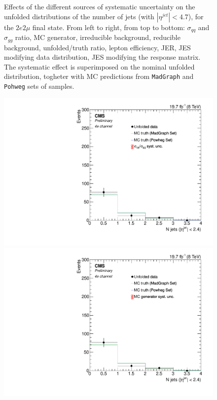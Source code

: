 \begin{figure}[hbtp]
\begin{center}
    \caption{Effects of the different sources of systematic uncertainty on the unfolded distributions of the number of jets (with $|\eta^{jet}|<4.7$), for the     
    $2e2\mu$ final state. From left to right, from top to bottom: $\sigma_{qq}$ and $\sigma_{gg}$ ratio, MC generator, irreducible background,
reducible background, unfolded/truth ratio, lepton efficiency, JER, JES modifying data distribution, JES modifying the response matrix. The systematic effect is superimposed on the nominal unfolded distribution, togheter with MC predictions from \texttt{MadGraph} and \texttt{Pohweg} sets of samples.}
    \label{fig:Jets_syst_2e2m}
  \end{center}
\end{figure}

\clearpage
\begin{figure}[hbtp]
  \begin{center}
    \includegraphics[width=0.8\cmsFigWidth]{Figures/Unfolding/Systematics/ZZTo4e_CentralJets_qqgg_Mad_fr}     
    \includegraphics[width=0.8\cmsFigWidth]{Figures/Unfolding/Systematics/ZZTo4e_CentralJets_MCgen_Mad_fr}     

\end{center}
\end{figure}

